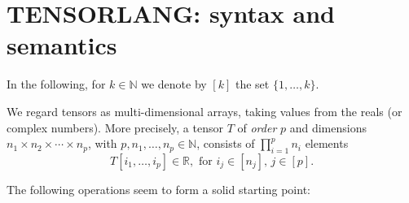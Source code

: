 
\section{TENSORLANG: syntax and semantics}\label{sec:tensorlang}

In the following, for $k\in\mathbb{N}$ we denote by $[k]$ the set $\{1,\ldots,k\}$.

We regard tensors as multi-dimensional arrays, taking values from the reals (or complex numbers).
More precisely, a tensor $T$ of \textit{order} $p$ and dimensions $n_1\times n_2\times\cdots\times n_p$,
with $p,n_1,\ldots,n_p\in \mathbb{N}$, consists of $\prod_{i=1}^p n_i$ elements
$$T[i_1,\ldots,i_p]\in\mathbb{R}, \text{ for $i_j\in [n_j]$, $j\in[p]$}.$$

The following operations seem to form a solid starting point:

